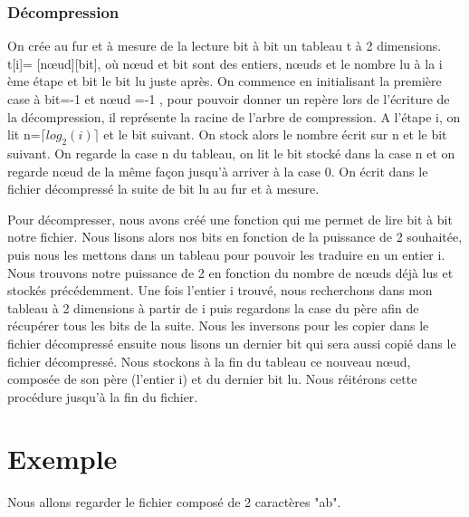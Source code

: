 \documentclass{report}
\begin{document}
\subsubsection{Décompression}
On crée au fur et à mesure de la lecture bit à bit un tableau t à 2 dimensions.  t[i]= [nœud][bit], où nœud et bit sont des entiers, nœuds et le nombre lu à la i ème étape et bit le bit lu juste après. 
On commence en initialisant la première case à  bit=-1 et nœud =-1 , pour pouvoir donner un repère lors de l'écriture de la décompression, il représente la racine de l'arbre de compression.  
A l'étape i, on lit n=$\lceil log_{2}(i) \rceil$ et le bit suivant. On stock alors le nombre écrit sur n et le bit suivant. On regarde la case n du tableau, on lit le bit stocké dans la case n et on regarde nœud de la même façon jusqu'à arriver à la case 0. On écrit dans le fichier décompressé la suite de bit lu au fur et à mesure.

Pour décompresser, nous avons créé une fonction qui me permet de lire bit à bit notre fichier. Nous lisons alors nos bits en fonction de la puissance de 2 souhaitée, puis nous les mettons dans un tableau pour pouvoir les traduire en un entier i. 
Nous trouvons notre puissance de 2 en fonction du nombre de nœuds déjà lus et stockés précédemment.
Une fois l'entier i  trouvé, nous recherchons dans mon tableau à 2 dimensions à partir de i puis regardons la case du père afin de récupérer tous les bits de la suite. Nous les inversons pour les copier dans le fichier décompressé ensuite nous lisons un dernier bit qui sera aussi copié dans le fichier décompressé.
Nous stockons à la fin du tableau ce nouveau nœud, composée de son père (l'entier i) et du dernier bit lu. 
Nous réitérons cette procédure jusqu'à la fin du fichier. 

 
\section*{Exemple}
Nous allons regarder le fichier composé de 2 caractères "ab".
\end{document}
